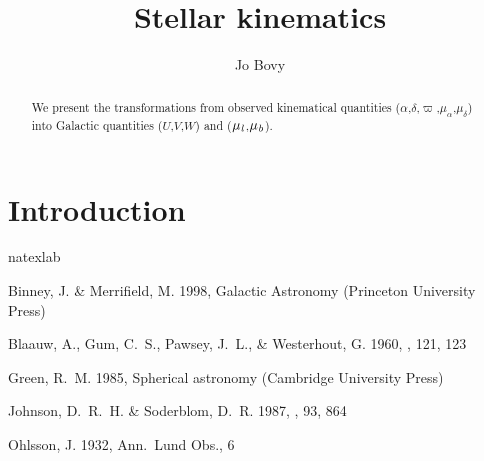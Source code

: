 \documentclass[12pt,preprint]{aastex}
\newcommand{\ra}{\ensuremath{\alpha}}
\newcommand{\dec}{\ensuremath{\delta}}
\newcommand{\pmra}{\ensuremath{\mu_{\ra}}}
\newcommand{\pmdec}{\ensuremath{\mu_{\dec}}}
\newcommand{\gall}{{\it l}}
\newcommand{\galb}{{\it b}}
\newcommand{\pmll}{\ensuremath{\mu_\gall}}
\newcommand{\pmbb}{\ensuremath{\mu_\galb}}
\newcommand{\galU}{\ensuremath{U}}
\newcommand{\galV}{\ensuremath{V}}
\newcommand{\galW}{\ensuremath{W}}
\newcommand{\parallax}{\ensuremath{\varpi}}
\begin{document}
\title{Stellar kinematics}
\author{
  Jo Bovy}

\date{}

\begin{abstract}
We present the transformations from observed kinematical quantities
(\ra,\dec,\parallax,\pmra,\pmdec) into Galactic quantities
(\galU,\galV,\galW) and (\pmll,\pmbb).
\end{abstract}



\section{Introduction}








\begin{thebibliography}{5}
\expandafter\ifx\csname natexlab\endcsname\relax\def\natexlab#1{#1}\fi

{Binney}, J. \& {Merrifield}, M. 1998, {Galactic Astronomy} (Princeton
  University Press)

{Blaauw}, A., {Gum}, C.~S., {Pawsey}, J.~L., \& {Westerhout}, G. 1960, \mnras,
  121, 123

{Green}, R.~M. 1985, {Spherical astronomy} (Cambridge University Press)

{Johnson}, D.~R.~H. \& {Soderblom}, D.~R. 1987, \aj, 93, 864

{Ohlsson}, J. 1932, Ann.~Lund Obs., 6

\end{thebibliography}
\end{document}
